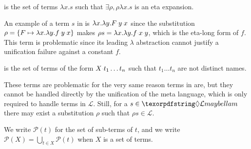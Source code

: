 \documentclass[sigconf,natbib=false,review]{acmart}
\newcommand{\appsep}{\ensuremath{\textcolor{lightgray}{\cdot}}}
\newcommand{\llambda}{\ensuremath{\mathcal{L}}\xspace}
\begin{document}
\begin{definition}[\maybeeta]\label{def:maybeeta}
  \maybeeta is the set of terms $\lambda x.s$ such that $\exists \rho, \rho \lambda x.s$
  is an eta expansion. %
\end{definition}

\noindent
An example of a term $s$ in \maybeeta{} is
$\lambda x.\lambda y.F \appsep y \appsep x$
since the substitution
$\rho = \{ F \mapsto \lambda x.\lambda y.f \appsep y \appsep x\}$
makes $\rho s = \lambda x.\lambda y.f \appsep x \appsep y$,
which is the eta-long form of $f$. This term is problematic since
its leading $\lambda$ abstraction cannot justify a
unification failure against a constant $f$.

\begin{definition}[\notllambda]\label{def:notllambda}
  \notllambda is the set of terms of the form $X \appsep t_1 \ldots t_n$
  such that $t_1 \ldots t_n$ are not distinct names.
\end{definition}

\noindent
These terms are problematic for the very same reason terms in \maybebeta are,
but they cannot be handled directly by the unification of the meta language, which
is only required to handle terms in \llambda. Still, for a $s \in \notllambda$
there may exist a substitution $\rho$ such that $\rho s \in \llambda$.


\newcommand{\subterm}[1]{\ensuremath{\mathcal{P}(#1)}}
We write $\subterm{t}$ for the set of sub-terms of $t$, and
we write $\subterm{X} = \bigcup_{t\in X} \subterm{t}$ when $X$ is a set of terms.
\end{document}
